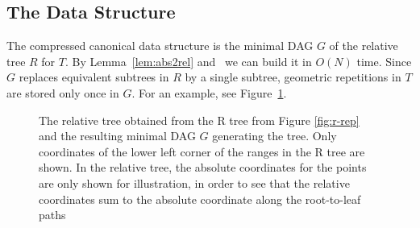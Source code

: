 \subsection{The Data Structure}
The compressed canonical data structure is the minimal DAG $G$ of the relative tree $R$ for $T$. By Lemma~\ref{lem:abs2rel} and~\cite{downey1980variations} we can build it in $O(N)$ time. Since $G$ replaces equivalent subtrees in $R$ by a single subtree, geometric repetitions in $T$ are stored only once in $G$. For an example, see Figure~\ref{fig:r-compression}. 
\begin{figure}[tb]
	\begin{center}
	\quad\quad\quad\quad{}
	\caption{The relative tree obtained from the R tree from Figure \ref{fig:r-rep} and the resulting minimal DAG $G$ generating the tree. Only coordinates of the lower left corner of the ranges in the R tree are shown. In the relative tree, the absolute coordinates for the points are only shown for illustration, in order to see that the relative coordinates sum to the absolute coordinate along the root-to-leaf paths \label{fig:r-compression}}
	\end{center}
\end{figure}

